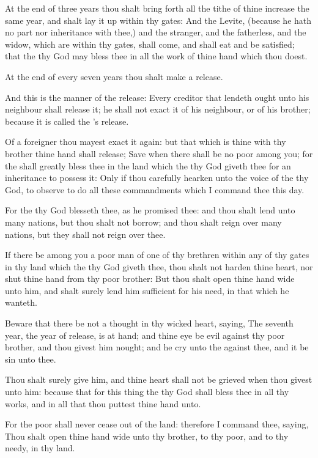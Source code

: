 \Verse At the end of three years thou shalt bring forth all the tithe of thine increase the same year, and shalt lay it up within thy gates: \Verse And the Levite, (because he hath no part nor inheritance with thee,) and the stranger, and the fatherless, and the widow, which are within thy gates, shall come, and shall eat and be satisfied; that the \LORD thy God may bless thee in all the work of thine hand which thou doest.


\Chapter
\Verse At the end of every seven years thou shalt make a release.

\Verse And this is the manner of the release: Every creditor that lendeth ought unto his neighbour shall release it; he shall not exact it of his neighbour, or of his brother; because it is called the \LORD's release.

\Verse Of a foreigner thou mayest exact it again: but that which is thine with thy brother thine hand shall release; \Verse Save when there shall be no poor among you; for the \LORD shall greatly bless thee in the land which the \LORD thy God giveth thee for an inheritance to possess it: \Verse Only if thou carefully hearken unto the voice of the \LORD thy God, to observe to do all these commandments which I command thee this day.

\Verse For the \LORD thy God blesseth thee, as he promised thee: and thou shalt lend unto many nations, but thou shalt not borrow; and thou shalt reign over many nations, but they shall not reign over thee.

\Verse If there be among you a poor man of one of thy brethren within any of thy gates in thy land which the \LORD thy God giveth thee, thou shalt not harden thine heart, nor shut thine hand from thy poor brother: \Verse But thou shalt open thine hand wide unto him, and shalt surely lend him sufficient for his need, in that which he wanteth.

\Verse Beware that there be not a thought in thy wicked heart, saying, The seventh year, the year of release, is at hand; and thine eye be evil against thy poor brother, and thou givest him nought; and he cry unto the \LORD against thee, and it be sin unto thee.

\Verse Thou shalt surely give him, and thine heart shall not be grieved when thou givest unto him: because that for this thing the \LORD thy God shall bless thee in all thy works, and in all that thou puttest thine hand unto.

\Verse For the poor shall never cease out of the land: therefore I command thee, saying, Thou shalt open thine hand wide unto thy brother, to thy poor, and to thy needy, in thy land.

